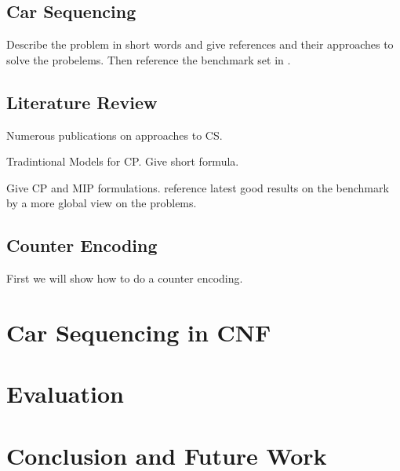 \documentclass[]{llncs}
\begin{document}
\subsection{Car Sequencing}

Describe the problem in short words and give references and their approaches to solve the probelems. Then reference the
benchmark set in \cite{Gent99}. 

\subsection{Literature Review}

Numerous publications on approaches to CS. 

Tradintional Models for CP. Give short formula. 

Give CP and MIP formulations. reference latest good results on the benchmark by a more global view on the problems. 

\subsection{Counter Encoding}

First we will show how to do a counter encoding. 

\section{Car Sequencing in CNF}

\section{Evaluation}

\section{Conclusion and  Future Work}




\end{document}
